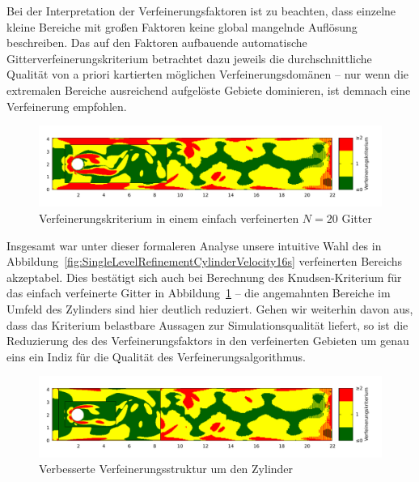 Bei der Interpretation der Verfeinerungsfaktoren ist zu beachten, dass einzelne kleine Bereiche mit großen Faktoren keine global mangelnde Auflösung beschreiben. Das auf den Faktoren aufbauende automatische Gitterverfeinerungskriterium betrachtet dazu jeweils die durchschnittliche Qualität von a priori kartierten möglichen Verfeinerungsdomänen -- nur wenn die extremalen Bereiche ausreichend aufgelöste Gebiete dominieren, ist demnach eine Verfeinerung empfohlen.

\begin{figure}[h]
\begin{adjustbox}{center}
\includegraphics[width=1.2\textwidth]{img/static/cylinder2d_single_refinement_n20_re100_16s_knudsen.pdf}
\end{adjustbox}
\caption{Verfeinerungskriterium in einem einfach verfeinerten \(N=20\) Gitter}
\label{fig:SingleLevelRefinementCylinderKnudsen16s}
\end{figure}

Insgesamt war unter dieser formaleren Analyse unsere intuitive Wahl des in Abbildung~\ref{fig:SingleLevelRefinementCylinderVelocity16s} verfeinerten Bereichs akzeptabel. Dies bestätigt sich auch bei Berechnung des Knudsen-Kriterium für das einfach verfeinerte Gitter in Abbildung~\ref{fig:SingleLevelRefinementCylinderKnudsen16s} -- die angemahnten Bereiche im Umfeld des Zylinders sind hier deutlich reduziert. Gehen wir weiterhin davon aus, dass das Kriterium belastbare Aussagen zur Simulationsqualität liefert, so ist die Reduzierung des des Verfeinerungsfaktors in den verfeinerten Gebieten um genau eins ein Indiz für die Qualität des Verfeinerungsalgorithmus.

\begin{figure}[h]
\begin{adjustbox}{center}
\includegraphics[width=1.2\textwidth]{img/static/cylinder2d_improved_grid_n20_re100_16s_knudsen.pdf}
\end{adjustbox}
\caption{Verbesserte Verfeinerungsstruktur um den Zylinder}
\end{figure}

